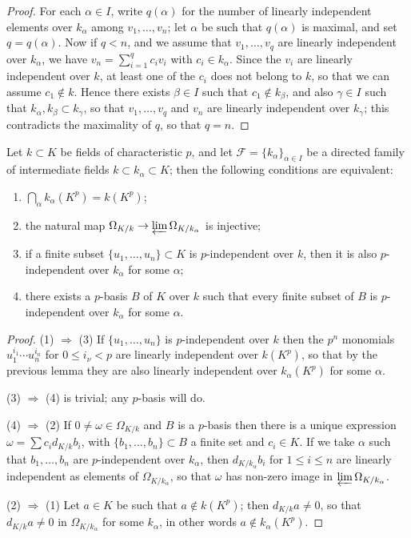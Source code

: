 \begin{proof}
For each $\alpha \in I$, write $q(\alpha)$ for the number of linearly independent
elements over $k_\alpha$ among $v_1, \ldots, v_n$; let $\alpha$ be such that $q(\alpha)$ is maximal,
and set $q = q(\alpha)$. Now if $q < n$, and we assume that $v_1, \ldots, v_q$ are linearly
independent over $k_\alpha$, we have $v_n = \sum_{i=1}^{q} c_iv_i$ with $c_i \in k_\alpha$. Since
the $v_i$ are linearly independent over $k$, at least one of the $c_i$ does not belong
to $k$, so that we can assume $c_1 \notin k$. Hence there exists $\beta \in I$ such that
$c_1 \notin k_\beta$, and also $\gamma \in I$ such that $k_\alpha, k_\beta \subset k_\gamma$, so that
$v_1, \ldots, v_q$ and $v_n$ are linearly independent over $k_\gamma$; this contradicts the
maximality of $q$, so that $q = n$.
\end{proof}

\begin{lemma}\label{lem:30.4}
Let $k \subset K$ be fields of characteristic $p$, and let $\mathcal{F} = \{k_\alpha\}_{\alpha \in I}$
be a directed family of intermediate fields $k \subset k_\alpha \subset K$; then the
following conditions are equivalent:
\begin{enumerate}[(1)]
  \item $\bigcap_\alpha k_\alpha(K^p) = k(K^p)$;
  \item the natural map $\Omega_{K/k} \to \varprojlim \Omega_{K/k_\alpha}$ is injective;
  \item if a finite subset $\{u_1, \ldots, u_n\} \subset K$ is $p$-independent over $k$, then
        it is also $p$-independent over $k_\alpha$ for some $\alpha$;
  \item there exists a $p$-basis $B$ of $K$ over $k$ such that every finite subset of
        $B$ is $p$-independent over $k_\alpha$ for some $\alpha$.
\end{enumerate}
\end{lemma}

\begin{proof}
(1) $\Rightarrow$ (3) If $\{u_1, \ldots, u_n\}$ is $p$-independent over $k$ then the $p^n$ monomials
$u_1^{i_1} \cdots u_n^{i_n}$ for $0 \le i_\nu < p$ are linearly independent over $k(K^p)$, so that by
the previous lemma they are also linearly independent over $k_\alpha(K^p)$ for some
$\alpha$.

(3) $\Rightarrow$ (4) is trivial; any $p$-basis will do.

(4) $\Rightarrow$ (2) If $0 \ne \omega \in \Omega_{K/k}$ and $B$ is a $p$-basis then there is a unique
expression $\omega = \sum c_id_{K/k}b_i$, with $\{b_1, \ldots, b_n\} \subset B$ a finite set and
$c_i \in K$. If we take $\alpha$ such that $b_1, \ldots, b_n$ are $p$-independent over
$k_\alpha$, then $d_{K/k_\alpha}b_i$ for $1 \le i \le n$ are linearly independent as elements of
$\Omega_{K/k_\alpha}$, so that $\omega$ has non-zero image in $\varprojlim \Omega_{K/k_\alpha}$.

(2) $\Rightarrow$ (1) Let $a \in K$ be such that $a \notin k(K^p)$; then $d_{K/k}a \ne 0$, so that
$d_{K/k}a \ne 0$ in $\Omega_{K/k_\alpha}$ for some $k_\alpha$, in other words $a \notin k_\alpha(K^p)$.
\end{proof}

